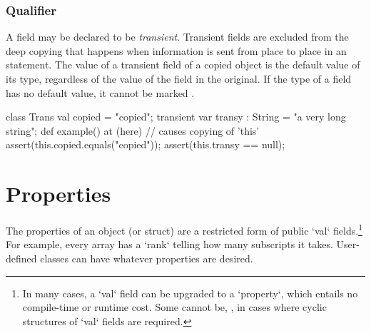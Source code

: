 \subsubsection{ Qualifier}
\label{TransientFields}

A field may be declared to be {\em transient}.  Transient fields are excluded
from the deep copying that happens when information is sent from place to
place in an  statement.    The value of a transient field of a copied
object is the default value of its type, regardless of the value of the field
in the original.  If the type of a field has no
default value, it cannot be marked .


% 
\begin{xten}
class Trans { 
   val copied = "copied";
   transient var transy : String = "a very long string";
   def example() {
      at (here) { // causes copying of 'this'
         assert(this.copied.equals("copied"));
         assert(this.transy == null);
      }
   }
}
\end{xten}


\section{Properties}
\label{PropertiesInClasses}

The properties of an object (or struct) are a restricted form of public
\xcd`val` fields.\footnote{In many cases, a 
\xcd`val` field can be upgraded to a \xcd`property`, which 
entails no compile-time or runtime cost.  Some cannot be, \eg, in cases where
cyclic structures of \xcd`val` fields are required.} 
For example,  every array has a \xcd`rank` telling
how many subscripts it takes.  User-defined classes can have whatever
properties are desired. 

